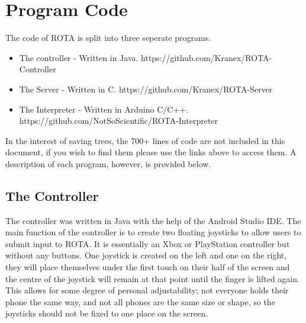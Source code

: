 \section{Program Code}
\par The code of ROTA is split into three seperate programs.
\begin{itemize}
  \item The controller - Written in Java. https://github.com/Kranex/ROTA-Controller
  \item The Server - Written in C. https://github.com/Kranex/ROTA-Server
  \item The Interpreter - Written in Arduino C/C++. https://github.com/NotSoScientific/ROTA-Interpreter
\end{itemize}
In the interest of saving trees, the 700+ lines of code are not included in this document,
if you wish to find them please use the links above to access them. A description of
each program, however, is provided below.

\subsection{The Controller}
\par
The controller was written in Java with the help of the Android Studio IDE.
The main function of the controller is to create two floating joysticks to allow
users to submit input to ROTA. It is essentially an Xbox or PlayStation controller
but without any buttons.
One joystick is created on the left and one on the right, they will place themselves
under the first touch on their half of the screen and the centre of the joystick
will remain at that point until the finger is lifted again. This allows for some degree of personal adjustability; not everyone holds their phone the same way,
and not all phones are the same size or shape, so the joysticks should not be fixed
to one place on the screen.

